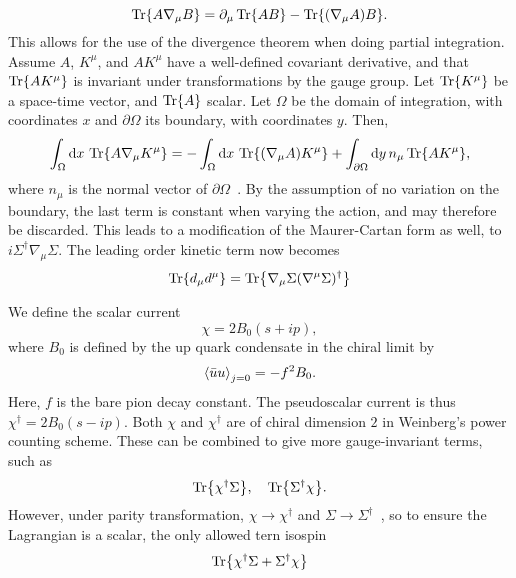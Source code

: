 \begin{equation*}
    \Tr{A \nabla_\mu B} = \partial_\mu \Tr{AB} - \Tr{(\nabla_\mu A) B}.
\end{equation*}
This allows for the use of the divergence theorem when doing partial integration.
Assume $A$, $K^\mu$, and $A K^\mu$ have a well-defined covariant derivative, and that $\Tr{A K^\mu}$ is invariant under transformations by the gauge group.
Let $\Tr{K^\mu}$ be a space-time vector, and $\Tr{A}$ scalar. 
Let $\Omega$ be the domain of integration, with coordinates $x$ and $\partial \Omega$ its boundary, with coordinates $y$. Then, 
\begin{align*}
    \int_\Omega \dd x \, \Tr{A \nabla_\mu K^\mu} 
    = 
    - \int_\Omega \dd x \, \Tr{(\nabla_\mu A) K^\mu}
    + \int_{\partial\Omega} \dd y\, n_\mu \Tr{A K^\mu},
\end{align*}
where $n_\mu$ is the normal vector of $\partial \Omega$~\cite{Carroll:spacetime}.
By the assumption of no variation on the boundary, the last term is constant when varying the action, and may therefore be discarded.
This leads to a modification of the Maurer-Cartan form as well, to $i \Sigma^\dagger \nabla_\mu \Sigma$.
The leading order kinetic term now becomes
\begin{equation}
    \label{leading order term sigma}
    \Tr{d_\mu d^\mu} = \Tr{\nabla_\mu \Sigma (\nabla^\mu \Sigma)^\dagger}
\end{equation}

We define the scalar current
\begin{equation}
    \chi = 2 B_0 (s + ip),
\end{equation}
where $B_0$ is defined by the up quark condensate in the chiral limit by
\begin{equation}
    \ex{\bar u u}_{j = 0} = - f^2 B_0.
\end{equation}
Here, $f$ is the bare pion decay constant.
The pseudoscalar current is thus $\chi^\dagger = 2 B_0 (s - ip)$.
Both $\chi$ and $\chi^\dagger$ are of chiral dimension $2$ in Weinberg's power counting scheme.
These can be combined to give more gauge-invariant terms, such as
\begin{equation}
    \Tr{\chi^\dagger \Sigma}, \quad \Tr{\Sigma^\dagger \chi}.
\end{equation}
However, under parity transformation, $\chi \rightarrow \chi^\dagger$ and $\Sigma \rightarrow \Sigma^\dagger$~\cite{Scherer2002IntroductionTC}, so to ensure the Lagrangian is a scalar, the only allowed tern isospin
\begin{equation}
    \label{leading order chi sigma term}
    \Tr{\chi^\dagger \Sigma + \Sigma^\dagger \chi}
\end{equation}

